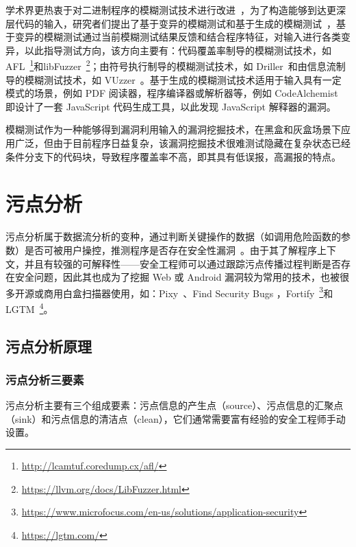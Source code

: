 学术界更热衷于对二进制程序的模糊测试技术进行改进~\cite{artoffuzz}，为了构造能够到达更深层代码的输入，研究者们提出了基于变异的模糊测试和基于生成的模糊测试~\cite{Zou2018}，基于变异的模糊测试通过当前模糊测试结果反馈和结合程序特征，对输入进行各类变异，以此指导测试方向，该方向主要有：代码覆盖率制导的模糊测试技术，如 AFL~\footnote{\url{http://lcamtuf.coredump.cx/afl/}}和libFuzzer~\footnote{\url{https://llvm.org/docs/LibFuzzer.html}}；由符号执行制导的模糊测试技术，如 Driller~\cite{Driller}和由信息流制导的模糊测试技术，如 VUzzer~\cite{VUzzer}。基于生成的模糊测试技术适用于输入具有一定模式的场景，例如 PDF 阅读器，程序编译器或解析器等，例如 CodeAlchemist~\cite{CodeAlchemist} 即设计了一套 JavaScript 代码生成工具，以此发现 JavaScript 解释器的漏洞。

模糊测试作为一种能够得到漏洞利用输入的漏洞挖掘技术，在黑盒和灰盒场景下应用广泛，但由于目前程序日益复杂，该漏洞挖掘技术很难测试隐藏在复杂状态已经条件分支下的代码块，导致程序覆盖率不高，即其具有低误报，高漏报的特点。

\section{污点分析}
污点分析属于数据流分析的变种，通过判断关键操作的数据（如调用危险函数的参数）是否可被用户操控，推测程序是否存在安全性漏洞~\cite{taint:wanglei}。由于其了解程序上下文，并且有较强的可解释性——安全工程师可以通过跟踪污点传播过程判断是否存在安全问题，因此其也成为了挖掘 Web 或 Android 漏洞较为常用的技术，也被很多开源或商用白盒扫描器使用，如：Pixy~\cite{pixy}、Find Security Bugs ，Fortify~\footnote{\url{https://www.microfocus.com/en-us/solutions/application-security}}和LGTM~\footnote{\url{https://lgtm.com/}}。

\subsection{污点分析原理}

\subsubsection{污点分析三要素}
污点分析主要有三个组成要素：污点信息的产生点（source）、污点信息的汇聚点（sink）和污点信息的清洁点（clean），它们通常需要富有经验的安全工程师手动设置。

